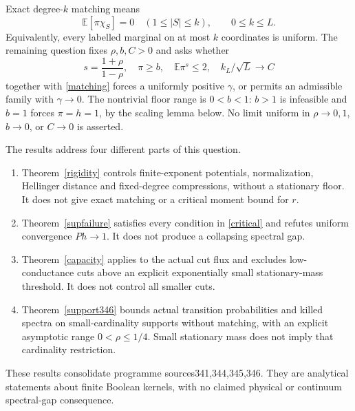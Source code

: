 \documentclass[11pt]{article}
\newcommand{\E}{\mathbb E}
\begin{document}
Exact degree-$k$ matching means
\begin{equation}\label{matching}
 \E[\pi\chi_S]=0\quad(1\leq |S|\leq k),\qquad 0\leq k\leq L.
\end{equation}
Equivalently, every labelled marginal on at most $k$ coordinates is uniform. The remaining question fixes $\rho,b,C>0$ and asks whether
\begin{equation}\label{critical}
 s=\frac{1+\rho}{1-\rho},\quad \pi\geq b,\quad \E\pi^s\leq2,
 \quad k_L/\sqrt L\longrightarrow C
\end{equation}
together with \eqref{matching} forces a uniformly positive $\gamma$, or permits an admissible family with $\gamma\to0$. The nontrivial floor range is $0<b<1$: $b>1$ is infeasible and $b=1$ forces $\pi=h=1$, by the scaling lemma below. No limit uniform in $\rho\to0,1$, $b\to0$, or $C\to0$ is asserted.

The results address four different parts of this question.
\begin{enumerate}
\item Theorem~\ref{rigidity} controls finite-exponent potentials, normalization, Hellinger distance and fixed-degree compressions, without a stationary floor. It does not give exact matching or a critical moment bound for $r$.
\item Theorem~\ref{supfailure} satisfies every condition in \eqref{critical} and refutes uniform convergence $Ph\to1$. It does not produce a collapsing spectral gap.
\item Theorem~\ref{capacity} applies to the actual cut flux and excludes low-conductance cuts above an explicit exponentially small stationary-mass threshold. It does not control all smaller cuts.
\item Theorem~\ref{support346} bounds actual transition probabilities and killed spectra on small-cardinality supports without matching, with an explicit asymptotic range $0<\rho\leq1/4$. Small stationary mass does not imply that cardinality restriction.
\end{enumerate}
These results consolidate programme sources341,344,345,346. They are analytical statements about finite Boolean kernels, with no claimed physical or continuum spectral-gap consequence.
\end{document}
